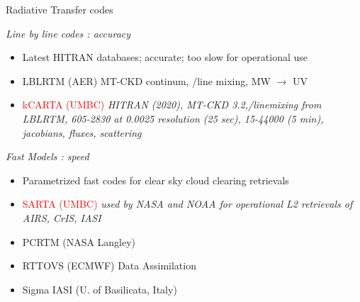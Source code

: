 \documentclass[10pt,t]{beamer}
\begin{document}



\begin{frame}[shrink=2]{Radiative Transfer codes}

\emph{Line by line codes : accuracy}
\vspace{-0.1in}
\begin{itemize}
  \item Latest HITRAN databases; accurate; too slow for operational use
  \item LBLRTM (AER) MT-CKD continum, \cd/\methane line mixing, MW $\rightarrow$ UV
  \item \textcolor{red}{kCARTA (UMBC)} \emph{HITRAN (2020), MT-CKD 3.2,\cd/\methane linemixing from LBLRTM, 
        605-2830 \wn at 0.0025 \wn resolution (25 sec), 15-44000 \wn (5 min), jacobians, 
        fluxes, scattering}
\end{itemize}

\emph{Fast Models : speed}
\vspace{-0.1in}
\begin{itemize}
  \item Parametrized fast codes for clear sky cloud clearing retrievals
  \item \textcolor{red}{SARTA (UMBC)} \emph{used by NASA and NOAA for operational L2 retrievals of AIRS, CrIS, IASI}
  \item PCRTM (NASA Langley)
  \item RTTOVS (ECMWF) Data Assimilation
  \item Sigma IASI (U. of Basilicata, Italy) 
\end{itemize}
\end{frame}
\end{document}
